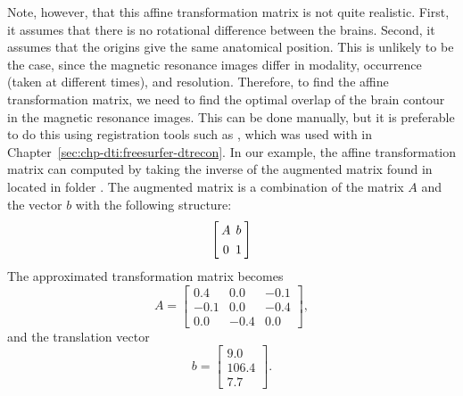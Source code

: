 Note, however, that this affine transformation matrix is not quite
realistic. First, it assumes that there is no rotational difference
between the brains. Second, it assumes that the origins give the same anatomical
position. This is unlikely to be the case, since the magnetic resonance images 
differ in modality, occurrence (taken at different times), and
resolution. Therefore, to find the affine transformation
matrix, we need to find the optimal overlap of the brain contour in
the magnetic resonance images. This can be done manually, but it is preferable 
to do this using registration tools such as , which was used with
 in Chapter~\ref{sec:chp-dti:freesurfer-dtrecon}. In
our example, the affine transformation matrix can computed by taking
the inverse of the augmented matrix found in 
located in folder . The augmented
matrix is a combination of the matrix $A$ and the vector $b$ with the
following structure:
\[\arraycolsep=2.0pt\def\arraystretch{1.3}
\left[
\begin{array}{cc}
  A  & b \\
  0 & 1\\
\end{array}\right]
\] 
The approximated
transformation matrix becomes
\[
A = \left[
\begin{array}{ccc}
  0.4 & 0.0 &-0.1 \\
 -0.1 & 0.0 &-0.4 \\
  0.0 &-0.4 & 0.0 
\end{array}\right],
\]
and the translation vector 
\[
b = \left[
\begin{array}{c}
  9.0 \\
106.4 \\
  7.7
\end{array}\right].
\]










